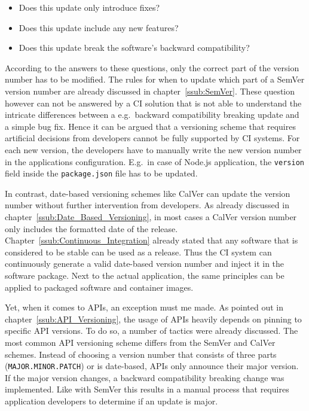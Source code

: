 \begin{itemize}
  \item Does this update only introduce fixes?
  \item Does this update include any new features?
  \item Does this update break the software's backward compatibility?
\end{itemize}

According to the answers to these questions, only the correct part of the
version number has to be modified. The rules for when to update which part of a
SemVer version number are already discussed in chapter~\ref{ssub:SemVer}. These
question however can not be answered by a \ac{CI} solution that is not able to
understand the intricate differences between a e.g.\ backward compatibility
breaking update and a simple bug fix. Hence it can be argued that a versioning
scheme that requires artificial decisions from developers cannot be fully
supported by \ac{CI} systems. For each new version, the developers have to
manually write the new version number in the applications configuration. E.g.\
in case of Node.js application, the \texttt{version} field inside the
\texttt{package.json} file has to be updated.

In contrast, date-based versioning schemes like CalVer can update the version
number without further intervention from developers. As already discussed in
chapter~\ref{ssub:Date_Based_Versioning}, in most cases a CalVer version number
only includes the formatted date of the release.
Chapter~\ref{ssub:Continuous_Integration} already stated that any software that
is considered to be stable can be used as a release. Thus the \ac{CI} system
can continuously generate a valid date-based version number and inject it in
the software package. Next to the actual application, the same principles can
be applied to packaged software and container images.

Yet, when it comes to \acp{API}, an exception must me made. As pointed out in
chapter~\ref{ssub:API_Versioning}, the usage of \acp{API} heavily depends on
pinning to specific \ac{API} versions. To do so, a number of tactics were
already discussed. The most common \ac{API} versioning scheme differs from the
SemVer and CalVer schemes. Instead of choosing a version number that consists
of three parts (\texttt{MAJOR.MINOR.PATCH}) or is date-based, \acp{API} only
announce their major version. If the major version changes, a backward
compatibility breaking change was implemented. Like with SemVer this results in
a manual process that requires application developers to determine if an update
is major.

